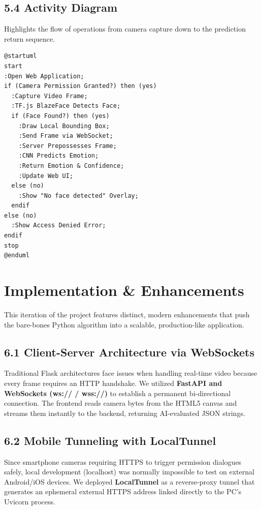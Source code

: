 \documentclass[12pt,a4paper]{report}
\begin{document}
\section*{5.4 Activity Diagram}
Highlights the flow of operations from camera capture down to the prediction return sequence.

\begin{verbatim}
@startuml
start
:Open Web Application;
if (Camera Permission Granted?) then (yes)
  :Capture Video Frame;
  :TF.js BlazeFace Detects Face;
  if (Face Found?) then (yes)
    :Draw Local Bounding Box;
    :Send Frame via WebSocket;
    :Server Prepossesses Frame;
    :CNN Predicts Emotion;
    :Return Emotion & Confidence;
    :Update Web UI;
  else (no)
    :Show "No face detected" Overlay;
  endif
else (no)
  :Show Access Denied Error;
endif
stop
@enduml
\end{verbatim}

\clearpage


\chapter{Implementation \& Enhancements}

This iteration of the project features distinct, modern enhancements that push the bare-bones Python algorithm into a scalable, production-like application. 

\section*{6.1 Client-Server Architecture via WebSockets}
Traditional Flask architectures face issues when handling real-time video because every frame requires an HTTP handshake. We utilized \textbf{FastAPI and WebSockets (ws:// / wss://)} to establish a permanent bi-directional connection. The frontend reads camera bytes from the HTML5 canvas and streams them instantly to the backend, returning AI-evaluated JSON strings.

\section*{6.2 Mobile Tunneling with LocalTunnel}
Since smartphone cameras requiring HTTPS to trigger permission dialogues safely, local development (localhost) was normally impossible to test on external Android/iOS devices. We deployed \textbf{LocalTunnel} as a reverse-proxy tunnel that generates an ephemeral external HTTPS address linked directly to the PC's Uvicorn process.
\end{document}
